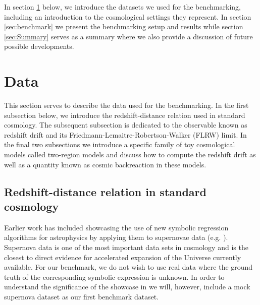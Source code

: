 \documentclass[a4paper,11pt]{article}
\begin{document}
	In section \ref{sec:data} below, we introduce the datasets we used for the benchmarking, including an introduction to the cosmological settings they represent. In section \ref{sec:benchmark} we present the benchmarking setup and results while section \ref{sec:Summary} serves as a summary where we also provide a discussion of future possible developments.
	
	
	
	


\section{Data}\label{sec:data}
This section serves to describe the data used for the benchmarking. In the first subsection below, we introduce the redshift-distance relation used in standard cosmology. The subsequent subsection is dedicated to the observable known as redshift drift and its Friedmann-Lemaitre-Robertson-Walker (FLRW) limit. In the final two subsections we introduce a specific family of toy cosmological models called two-region models and discuss how to compute the redshift drift as well as a quantity known as cosmic backreaction in these models.
	
\subsection{Redshift-distance relation in standard cosmology}
Earlier work has included showcasing the use of new symbolic regression algorithms for astrophysics by applying them to supernovae data (e.g. \cite{physics_motivation, Hubble}). Supernova data is one of the most important data sets in cosmology and is the closest to direct evidence for accelerated expansion of the Universe currently available. For our benchmark, we do not wish to use real data where the ground truth of the corresponding symbolic expression is unknown. In order to understand the significance of the showcase in \cite{physics_motivation, Hubble} we will, however, include a mock supernova dataset as our first benchmark dataset.
\end{document}
